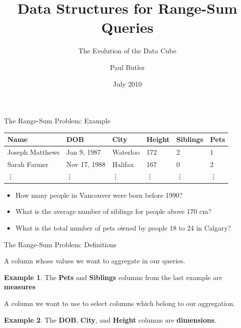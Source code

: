 \documentclass{beamer}
\title{Data Structures for Range-Sum Queries}
\subtitle{The Evolution of the Data Cube}
\author{Paul Butler}
\institute{
    CUMC 2010\\
    Waterloo, Ontario
}
\date{July 2010}
\theoremstyle{definition}
\newtheorem{myexample}{Example}
\theoremstyle{definition}
\begin{document}
\begin{frame}[plain]
    \titlepage
\end{frame}

\begin{frame}{The Range-Sum Problem: Example}
    \begin{table}[h]\footnotesize
        \begin{tabular}{ | l | l | l | l | l | l |}
        \hline
        \rowcolor{red!20!green!20!blue!20}
        \textbf{Name} & \textbf{DOB} & \textbf{City} & \textbf{Height} & \textbf{Siblings} & \textbf{Pets} \\ \hline
        Joseph Matthews & Jan 9, 1987 & Waterloo & 172 & 2 &  1 \\ \hline
        Sarah Farmer & Nov 17, 1988 & Halifax & 167 & 0 & 2 \\ \hline
        \vdots & \vdots & \vdots & \vdots & \vdots & \vdots \\ \hline
        \end{tabular}
    \end{table}

    \begin{itemize}
        \item How many people in Vancouver were born before 1990?
        \item What is the average number of siblings for people above 170 cm?
        \item What is the total number of pets owned by people 18 to 24 in Calgary?
    \end{itemize}
\end{frame}

\begin{frame}{The Range-Sum Problem: Definitions}
    \begin{definition}[Measure]
        A column whose values we want to aggregate in our queries.
    \end{definition}
    \begin{myexample}
        The \textbf{Pets} and \textbf{Siblings} columns from the last example are \textbf{measures}
    \end{myexample}
    \begin{definition}[Dimension]
        A column we want to use to select columns which belong to our aggregation.
    \end{definition}
    \begin{myexample}
        The \textbf{DOB}, \textbf{City}, and \textbf{Height} columns are \textbf{dimensions}.
    \end{myexample}
\end{frame}
\end{document}
